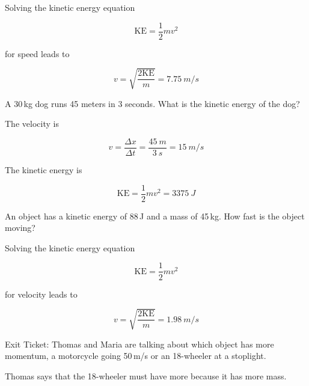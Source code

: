 \documentclass[answers]{exam}
\begin{document}
\begin{questions}
\begin{solution}
Solving the kinetic energy equation

\begin{equation*}
    \mathrm{KE} = \frac{1}{2} mv^2
\end{equation*}

for speed leads to

\begin{equation*}
    v = \sqrt{\frac{2\mathrm{KE}}{m}} = \boxed{\SI{7.75}{m/s}}
\end{equation*}
\end{solution}

\question %
A 30\,kg dog runs 45 meters in 3 seconds. What is the kinetic energy of the dog?

\begin{solution}
The velocity is

\begin{equation*}
    v = \frac{\Delta x}{\Delta t} = \frac{\SI{45}{m}}{\SI{3}{s}} = \SI{15}{m/s}
\end{equation*}

The kinetic energy is

\begin{equation*}
    \mathrm{KE} = \frac{1}{2} m v^2 = \boxed{\SI{3375}{J}}
\end{equation*}
\end{solution}




\question %
An object has a kinetic energy of 88\,J and a mass of 45\,kg. How fast is the object moving?

\begin{solution}
Solving the kinetic energy equation 

\begin{equation*}
    \mathrm{KE} = \frac{1}{2}mv^2
\end{equation*}

for velocity leads to

\begin{equation*}
    v = \sqrt{\frac{2\mathrm{KE}}{m}} = \boxed{\SI{1.98}{m/s}}
\end{equation*}
\end{solution}
 
\question %
Exit Ticket: Thomas and Maria are talking about which object has more momentum, a motorcycle going 50\,m/s or an 18-wheeler at a stoplight. 

Thomas says that the 18-wheeler must have more because it has more mass. 


\end{questions}
\end{document}
